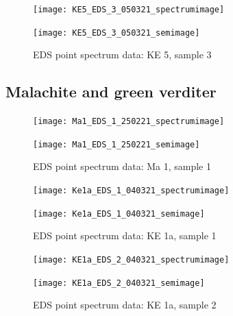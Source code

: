 \begin{figure}[H]
\centering
\begin{minipage}{.45\textwidth}
  \centering
  \texttt{[image: KE5\_EDS\_3\_050321\_spectrumimage]}
\end{minipage}
\begin{minipage}{.45\textwidth}
  \centering
  \texttt{[image: KE5\_EDS\_3\_050321\_semimage]}
\end{minipage}
\caption[EDS point spectrum data: KE 5, sample 3]{EDS point spectrum data: KE 5, sample 3}
\label{fig:ke5_point_eds_3}
\end{figure}


\subsection{Malachite and green verditer}


\begin{figure}[H]
\centering
\begin{minipage}{.45\textwidth}
  \centering
  \texttt{[image: Ma1\_EDS\_1\_250221\_spectrumimage]}
\end{minipage}
\begin{minipage}{.45\textwidth}
  \centering
  \texttt{[image: Ma1\_EDS\_1\_250221\_semimage]}
\end{minipage}
\caption[EDS point spectrum data: Ma 1, sample 1]{EDS point spectrum data: Ma 1, sample 1}
\label{fig:ma1_point_eds_1}
\end{figure}

\begin{figure}[H]
\centering
\begin{minipage}{.45\textwidth}
  \centering
  \texttt{[image: Ke1a\_EDS\_1\_040321\_spectrumimage]}
\end{minipage}
\begin{minipage}{.45\textwidth}
  \centering
  \texttt{[image: Ke1a\_EDS\_1\_040321\_semimage]}
\end{minipage}
\caption[EDS point spectrum data: KE 1a, sample 1]{EDS point spectrum data: KE 1a, sample 1}
\label{fig:ke1a_point_eds_1}
\end{figure}

\begin{figure}[H]
\centering
\begin{minipage}{.45\textwidth}
  \centering
  \texttt{[image: KE1a\_EDS\_2\_040321\_spectrumimage]}
\end{minipage}
\begin{minipage}{.45\textwidth}
  \centering
  \texttt{[image: KE1a\_EDS\_2\_040321\_semimage]}
\end{minipage}
\caption[EDS point spectrum data: KE 1a, sample 2]{EDS point spectrum data: KE 1a, sample 2}
\label{fig:ke1a_point_eds_2}
\end{figure}

